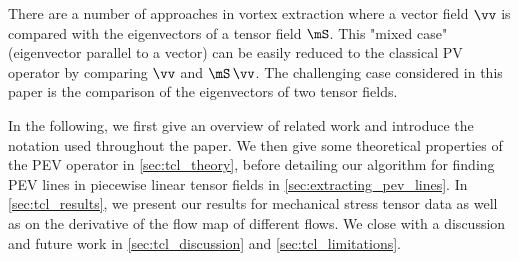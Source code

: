 %
There are a number of approaches in vortex extraction where a vector field $\vv$
is compared with the eigenvectors of a tensor field $\mS$.
%
This "mixed case" (eigenvector parallel to a vector) can be easily reduced to
the classical PV operator by comparing $\vv$ and $\mS\,\vv$.
%
The challenging case considered in this paper is the comparison of the
eigenvectors of two tensor fields.

%
In the following, we first give an overview of related work and introduce the
notation used throughout the paper.
%
We then give some theoretical properties of the PEV operator in
\cref{sec:tcl_theory}, before detailing our algorithm for finding PEV lines in
piecewise linear tensor fields in \cref{sec:extracting_pev_lines}.
%
In \cref{sec:tcl_results}, we present our results for mechanical stress tensor
data as well as on the derivative of the flow map of different flows.
%
We close with a discussion and future work in \cref{sec:tcl_discussion} and
\cref{sec:tcl_limitations}.
%

